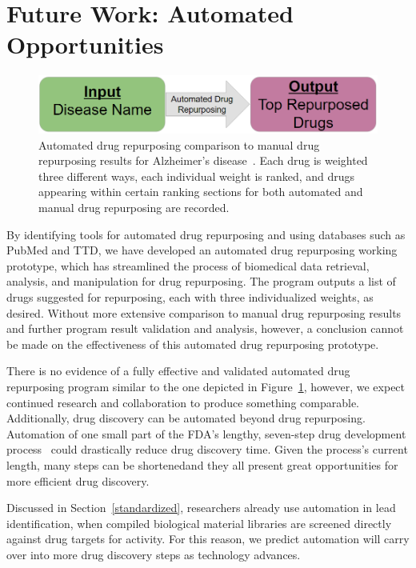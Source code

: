 \documentclass{IEEEtran}
\begin{document}
	\section{Future Work: Automated Opportunities}
		\begin{figure}[h]
			\centering
			\includegraphics[width=\linewidth]{autorepurp}
			\caption{\footnotesize Automated drug repurposing comparison to manual drug repurposing results for Alzheimer's disease~\cite{zhang16}.  Each drug is weighted three different ways, each individual weight is ranked, and drugs appearing within certain ranking sections for both automated and manual drug repurposing are recorded.}
			\label{autorepurp}
		\end{figure} 
		
		By identifying tools for automated drug repurposing and using databases such as PubMed and TTD, we have developed an automated drug repurposing working prototype, which has streamlined the process of biomedical data retrieval, analysis, and manipulation for drug repurposing.  The program outputs a list of drugs suggested for repurposing, each with three individualized weights, as desired.  Without more extensive comparison to manual drug repurposing results and further program result validation and analysis, however, a conclusion cannot be made on the effectiveness of this automated drug repurposing prototype.
		
		There is no evidence of a fully effective and validated automated drug repurposing program similar to the one depicted in Figure~\ref{autorepurp}, however, we expect continued research and collaboration to produce something comparable.  Additionally, drug discovery can be automated beyond drug repurposing.  Automation of one small part of the FDA's lengthy, seven-step drug development process~\cite{xu} could drastically reduce drug discovery time.  Given the process's current length, many steps can be shortened\textemdash and they all present great opportunities for more efficient drug discovery.   
		
		Discussed in Section~\ref{standardized}, researchers already use automation in lead identification, when compiled biological material libraries are screened directly against drug targets for activity. For this reason, we predict automation will carry over into more drug discovery steps as technology advances.  
	
\end{document}
